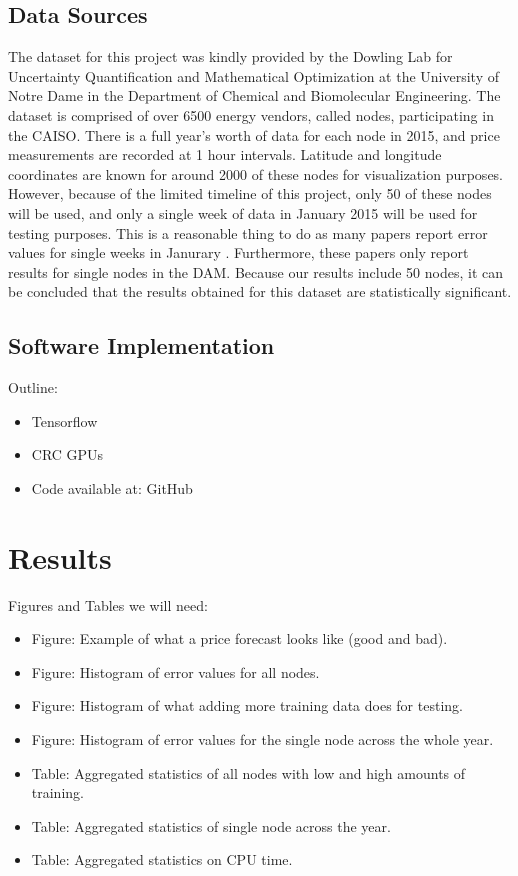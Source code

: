 \documentclass[sigconf]{acmart}
\begin{document}
\subsection{Data Sources}
The dataset for this project was kindly provided by the Dowling Lab for Uncertainty Quantification and Mathematical Optimization at the University of Notre Dame in the Department of Chemical and Biomolecular Engineering. The dataset is comprised of over 6500 energy vendors, called nodes, participating in the CAISO. There is a full year's worth of data for each node in 2015, and price measurements are recorded at 1 hour intervals. Latitude and longitude coordinates are known for around 2000 of these nodes for visualization purposes. However, because of the limited timeline of this project, only 50 of these nodes will be used, and only a single week of data in January 2015 will be used for testing purposes. This is a reasonable thing to do as many papers report error values for single weeks in Janurary \cite{Conejo2005a,Garcia2005,Tan2010}. Furthermore, these papers only report results for single nodes in the DAM. Because our results include 50 nodes, it can be concluded that the results obtained for this dataset are statistically significant. 

\subsection{Software Implementation}

Outline:
\begin{itemize}
	\item Tensorflow
	\item CRC GPUs
	\item Code available at: GitHub
\end{itemize}


\section{Results}
\label{sec:results}

Figures and Tables we will need:
\begin{itemize}
	\item Figure: Example of what a price forecast looks like (good and bad).
	\item Figure: Histogram of error values for all nodes.
	\item Figure: Histogram of what adding more training data does for testing.
	\item Figure: Histogram of error values for the single node across the whole year.
	\item Table: Aggregated statistics of all nodes with low and high amounts of training.
	\item Table: Aggregated statistics of single node across the year.
	\item Table: Aggregated statistics on CPU time.
\end{itemize}
\end{document}
